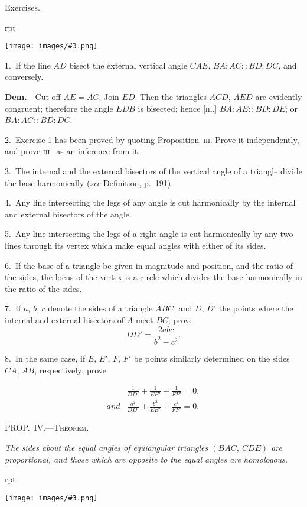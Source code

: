 \documentclass[oneside]{book}
\newcounter{wrapwidth}
\newcommand\mypropl[2]{
\bigskip\Needspace*{4\baselineskip}\begin{center}\textsc{#1}\end{center}
\hspace{\parindent}\emph{#2}\par\medskip
}
\newcommand\exhead[1]{
\Needspace*{5\baselineskip}\begin{center}
\textsf{#1}
\end{center}
}
\newcommand\imgflow[3]{
\setcounter{wrapwidth}{#1}
\begin{wrapfigure}[#2]{r}{\value{wrapwidth}pt}
\begin{center}
\vspace{-0.3in}
\texttt{[image: images/\#3.png]}
\end{center}
\end{wrapfigure}
}
\begin{document}
\exhead{Exercises.}

\imgflow{142}{9}{f172}

\begin{footnotesize}
1.~If the line $AD$ bisect the external vertical angle $CAE$,
$BA : AC :: BD : DC$, and conversely.

\textbf{Dem.}---Cut off $AE = AC$. Join
$ED$. Then the triangles $ACD$,
$AED$ are evidently congruent;
therefore the angle $EDB$ is bisected;
hence [\textsc{iii}.] $BA : AE ::
BD : DE$; or $BA : AC :: BD : DC$.

2.~Exercise 1 has been proved
by quoting Proposition~\textsc{iii}. Prove
it independently, and prove \textsc{iii}.\ as an inference from it.

3.~The internal and the external bisectors of the vertical angle
of a triangle divide the base harmonically (\textit{see} Definition, p.~191).

4.~Any line intersecting the legs of any angle is cut harmonically
by the internal and external bisectors of the angle.

5.~Any line intersecting the legs of a right angle is cut harmonically
by any two lines through its vertex which make equal
angles with either of its sides.

6.~If the base of a triangle be given in magnitude and position,
and the ratio of the sides, the locus of the vertex is a circle which
divides the base harmonically in the ratio of the sides.

7.~If $a$, $b$, $c$ denote the sides of a triangle $ABC$, and $D$, $D'$ the
points where the internal and external bisectors of $A$ meet $BC$;
prove
\[
DD'=\frac{2abc}{b^2-c^2}.
\]

8.~In the same case, if $E$, $E'$, $F$, $F'$ be points similarly determined
on the sides $CA$, $AB$, respectively; prove

\begin{align*}
&\frac{1}{DD'}+\frac{1}{EE'}+\frac{1}{FF'}=0,\\
and &\frac{a^2}{DD'}+\frac{b^2}{EE'}+\frac{c^2}{FF'}=0.
\end{align*}
\par\end{footnotesize}

\mypropl{PROP\@.~IV\@.---Theorem.}{The sides about the equal angles of equiangular triangles
$(BAC,\ CDE)$ are proportional, and those which
are opposite to the equal angles are homologous.}

\imgflow{125}{8}{f173}
\end{document}
